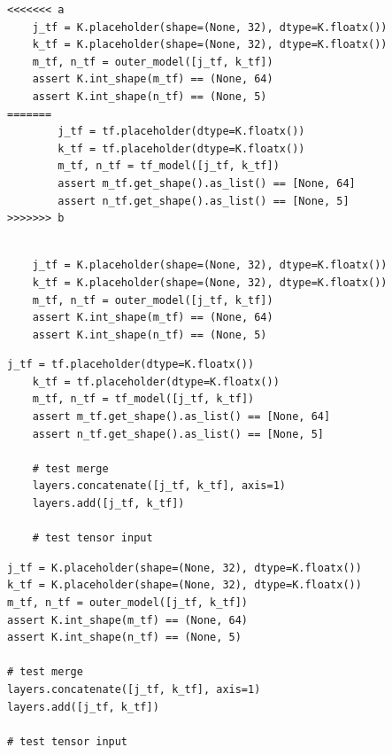 %

\begin{lstlisting}[style=conflictcode,title={\textbf{The conflict} (\texttt{0xe63ff0ddae988357})}]
<<<<<<< a
    j_tf = K.placeholder(shape=(None, 32), dtype=K.floatx())
    k_tf = K.placeholder(shape=(None, 32), dtype=K.floatx())
    m_tf, n_tf = outer_model([j_tf, k_tf])
    assert K.int_shape(m_tf) == (None, 64)
    assert K.int_shape(n_tf) == (None, 5)
=======
        j_tf = tf.placeholder(dtype=K.floatx())
        k_tf = tf.placeholder(dtype=K.floatx())
        m_tf, n_tf = tf_model([j_tf, k_tf])
        assert m_tf.get_shape().as_list() == [None, 64]
        assert n_tf.get_shape().as_list() == [None, 5]
>>>>>>> b
\end{lstlisting}

\begin{lstlisting}[style=conflictcode,title={\textbf{Ground-truth resolution} (5 lines, 250 characters)}]

    j_tf = K.placeholder(shape=(None, 32), dtype=K.floatx())
    k_tf = K.placeholder(shape=(None, 32), dtype=K.floatx())
    m_tf, n_tf = outer_model([j_tf, k_tf])
    assert K.int_shape(m_tf) == (None, 64)
    assert K.int_shape(n_tf) == (None, 5)
\end{lstlisting}

\begin{lstlisting}[style=conflictcode,title={\textbf{Apertus-8B, without the skill} --- edit 0.430, winnowing 0.387, 343 characters}]
j_tf = tf.placeholder(dtype=K.floatx())
    k_tf = tf.placeholder(dtype=K.floatx())
    m_tf, n_tf = tf_model([j_tf, k_tf])
    assert m_tf.get_shape().as_list() == [None, 64]
    assert n_tf.get_shape().as_list() == [None, 5]

    # test merge
    layers.concatenate([j_tf, k_tf], axis=1)
    layers.add([j_tf, k_tf])

    # test tensor input
\end{lstlisting}

\begin{lstlisting}[style=conflictcode,title={\textbf{Apertus-8B, with v2 in the system prompt} --- edit 0.702, winnowing 0.861, 330 characters}]
j_tf = K.placeholder(shape=(None, 32), dtype=K.floatx())
k_tf = K.placeholder(shape=(None, 32), dtype=K.floatx())
m_tf, n_tf = outer_model([j_tf, k_tf])
assert K.int_shape(m_tf) == (None, 64)
assert K.int_shape(n_tf) == (None, 5)

# test merge
layers.concatenate([j_tf, k_tf], axis=1)
layers.add([j_tf, k_tf])

# test tensor input
\end{lstlisting}

